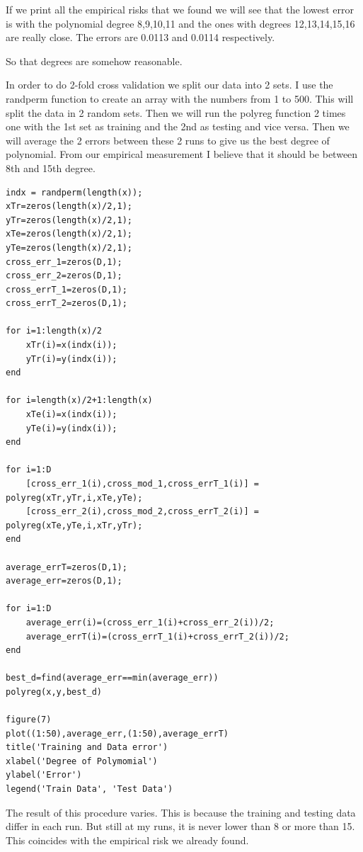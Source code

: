 If we print all the empirical risks that we found we will see
that the lowest error is with the polynomial degree 8,9,10,11
and the ones with degrees 12,13,14,15,16 are really close.
The errors are 0.0113 and 0.0114 respectively.

So that degrees are somehow reasonable.

In order to do 2-fold cross validation we split our data into 2 sets.
I use the randperm function to create an array with the numbers from
1 to 500. This will split the data in 2 random sets. Then we will 
run the polyreg function 2 times one with the 1st set as training and
the 2nd as testing and vice versa. Then we will average the 2 errors
between these 2 runs to give us the best degree of polynomial. From
our empirical measurement I believe that it should be between 8th and
15th degree.

\begin{verbatim}
indx = randperm(length(x));
xTr=zeros(length(x)/2,1);
yTr=zeros(length(x)/2,1);
xTe=zeros(length(x)/2,1);
yTe=zeros(length(x)/2,1);
cross_err_1=zeros(D,1);
cross_err_2=zeros(D,1);
cross_errT_1=zeros(D,1);
cross_errT_2=zeros(D,1);

for i=1:length(x)/2
    xTr(i)=x(indx(i));
    yTr(i)=y(indx(i));
end

for i=length(x)/2+1:length(x)
    xTe(i)=x(indx(i));
    yTe(i)=y(indx(i));
end

for i=1:D
    [cross_err_1(i),cross_mod_1,cross_errT_1(i)] = polyreg(xTr,yTr,i,xTe,yTe);
    [cross_err_2(i),cross_mod_2,cross_errT_2(i)] = polyreg(xTe,yTe,i,xTr,yTr);
end

average_errT=zeros(D,1);
average_err=zeros(D,1);

for i=1:D
    average_err(i)=(cross_err_1(i)+cross_err_2(i))/2;
    average_errT(i)=(cross_errT_1(i)+cross_errT_2(i))/2;
end

best_d=find(average_err==min(average_err))
polyreg(x,y,best_d)

figure(7)
plot((1:50),average_err,(1:50),average_errT)
title('Training and Data error')
xlabel('Degree of Polymomial')
ylabel('Error')
legend('Train Data', 'Test Data')
\end{verbatim}

The result of this procedure varies. This is because the training and
testing data differ in each run. But still at my runs, it is never lower
than 8 or more than 15. This coincides with the empirical risk
we already found.


